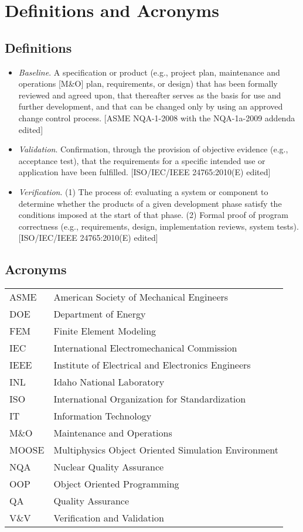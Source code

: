 \documentclass{INLreport}
\begin{document}
\section{Definitions and Acronyms}

\subsection{Definitions}

\begin{itemize}
\item \textit{Baseline}. A specification or product (e.g., project plan, maintenance and operations [M\&O] plan, requirements,
  or design) that has been formally reviewed and agreed upon, that thereafter serves as the basis for use and further development,
  and that can be changed only by using an approved change control process. [ASME NQA-1-2008 with the NQA-1a-2009 addenda edited]

\item \textit{Validation}. Confirmation, through the provision of objective evidence (e.g., acceptance test), that the requirements
  for a specific intended use or application have been fulfilled. [ISO/IEC/IEEE 24765:2010(E) edited]

\item \textit{Verification}. (1) The process of: evaluating a system or component to determine whether the products of a given
  development phase satisfy the conditions imposed at the start of that phase. (2) Formal proof of program correctness (e.g.,
  requirements, design, implementation reviews, system tests). [ISO/IEC/IEEE 24765:2010(E) edited]
\end{itemize}

\subsection{Acronyms}

\begin{tabular}{l l}
  ASME    & American Society of Mechanical Engineers \\
  DOE     & Department of Energy \\
  FEM     & Finite Element Modeling \\
  IEC     & International Electromechanical Commission \\
  IEEE    & Institute of Electrical and Electronics Engineers \\
  INL     & Idaho National Laboratory \\
  ISO     & International Organization for Standardization \\
  IT      & Information Technology \\
  M\&O    & Maintenance and Operations \\
  MOOSE   & Multiphysics Object Oriented Simulation Environment \\
  NQA     & Nuclear Quality Assurance \\
  OOP     & Object Oriented Programming \\
  QA      & Quality Assurance \\
  V\&V    & Verification and Validation \\
\end{tabular}
\end{document}

